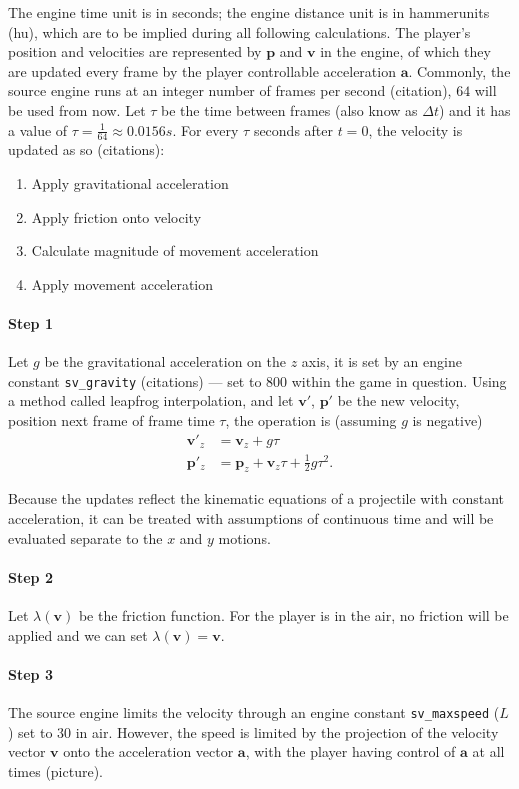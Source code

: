 \documentclass[a4paper,12pt]{article}
\newcommand{\tvec}[1]{\boldsymbol{#1}}
\newcommand{\ta}{\tvec{a}}
\newcommand{\tv}{\tvec{v}}
\newcommand{\tp}{\tvec{p}}
\begin{document}
The engine time unit is in seconds; the engine distance unit is in hammerunits (hu), which are to be implied during all following calculations. The player's position and velocities are represented by $\tp$ and $\tv$ in the engine, of which they are updated every frame by the player controllable acceleration $\ta$. Commonly, the source engine runs at an integer number of frames per second (citation), $64$ will be used from now. Let $\tau$ be the time between frames (also know as $\Delta t$) and it has a value of $\tau = \frac{1}{64} \approx 0.0156 \si{s}$. For every $\tau$ seconds after $t=0$, the velocity is updated as so (citations):
\begin{enumerate}
    \item Apply gravitational acceleration
    \item Apply friction onto velocity
    \item Calculate magnitude of movement acceleration
    \item Apply movement acceleration
\end{enumerate}

\paragraph{Step 1} Let $g$ be the gravitational acceleration on the $z$ axis, it is set by an engine constant \verb|sv_gravity| (citations) --- set to $800$ within the game in question. Using a method called leapfrog interpolation, and let $\tv'$, $\tp'$ be the new velocity, position next frame of frame time $\tau$, the operation is (assuming $g$ is negative)
\begin{align*}
    \tv'_z &= \tv_z + g\tau\\
    \tp'_z &= \tp_z + \tv_z\tau + \frac{1}{2}g\tau^2.
\end{align*}

Because the updates reflect the kinematic equations of a projectile with constant acceleration, it can be treated with assumptions of continuous time and will be evaluated separate to the $x$ and $y$ motions.


\paragraph{Step 2} Let $\lambda(\tv)$ be the friction function. For the player is in the air, no friction will be applied and we can set $\lambda(\tv) = \tv$.

\paragraph{Step 3} The source engine limits the velocity through an engine constant \verb|sv_maxspeed| ($L$) set to $30$ in air. However, the speed is limited by the projection of the velocity vector $\tv$ onto the acceleration vector $\ta$, with the player having control of $\ta$ at all times (picture).
\end{document}
